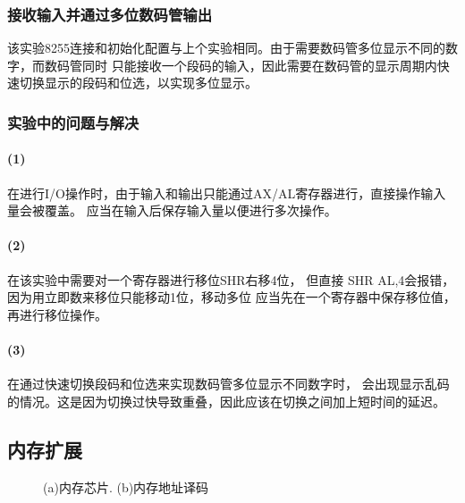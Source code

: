 \documentclass[12pt, a4paper, oneside]{ctexart}
\begin{document}
    \subsubsection{接收输入并通过多位数码管输出}
    该实验8255连接和初始化配置与上个实验相同。由于需要数码管多位显示不同的数字，而数码管同时
    只能接收一个段码的输入，因此需要在数码管的显示周期内快速切换显示的段码和位选，以实现多位显示。

    \subsubsection{实验中的问题与解决}
    \paragraph{(1)} 在进行I/O操作时，由于输入和输出只能通过AX/AL寄存器进行，直接操作输入量会被覆盖。
    应当在输入后保存输入量以便进行多次操作。

    \paragraph{(2)} 在该实验中需要对一个寄存器进行移位SHR右移4位，
    但直接 SHR AL,4会报错，因为用立即数来移位只能移动1位，移动多位
    应当先在一个寄存器中保存移位值，再进行移位操作。

    \paragraph{(3)} 在通过快速切换段码和位选来实现数码管多位显示不同数字时，
    会出现显示乱码的情况。这是因为切换过快导致重叠，因此应该在切换之间加上短时间的延迟。


    

    \subsection{内存扩展}

    \begin{figure}[!h]
        \centering
        \hfil
        \caption{(a)内存芯片. (b)内存地址译码}
    \end{figure}
\end{document}

